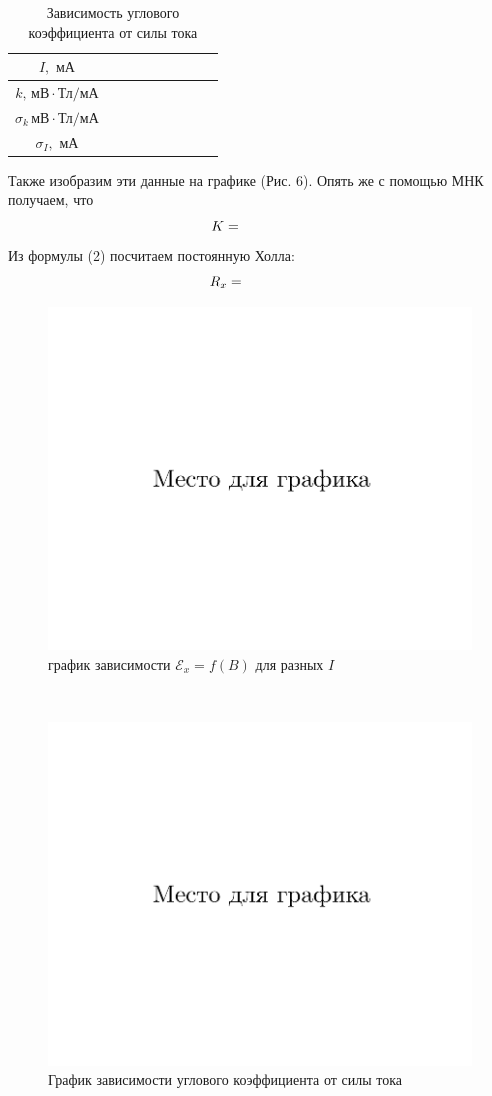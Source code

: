 \documentclass{physlab}
\begin{document}
\begin{table}[H]
	\centering
	\caption{Зависимость углового коэффициента от силы тока}
	\label{my-label}
	\begin{tabu}{|c|X[c]|X[c] |X[c]| X[c]| X[c]| X[c]| X[c]| X[c]|}
		\hline
		$I, \text{ мА}$                                           & \val    &    &     &    &     &     &    &    \\ \hline
		$k,\,\text{мВ}\cdot\text{Тл}\slash\text{мА}$          & & & & & & & &\\ \hline
		$\sigma_k\,\text{мВ}\cdot\text{Тл}\slash\text{мА}$ & & & & & & & &  \\ \hline
		$\sigma_I, \text{ мА}$                                 &                                              \\\hline
	\end{tabu}
\end{table}
Также изобразим эти данные на графике (Рис. 6). Опять же с помощью МНК получаем, что $$K = \val$$
Из формулы (2) посчитаем постоянную Холла:
$$R_x = \val$$
	\begin {figure}[H]
		\begin{center}
			\includegraphics[width = 0.65 \textwidth]{foo}
			\caption{график зависимости $\mathscr{E}_x = f(B)$ для разных $I$}
		\end{center}
	\end {figure}
~
		\begin {figure}[b!]
	\begin{center}
		\includegraphics[width = 0.65 \textwidth]{foo}
		\caption{График зависимости углового коэффициента от силы тока}
	\end{center}
	\end {figure}
\end{document}
